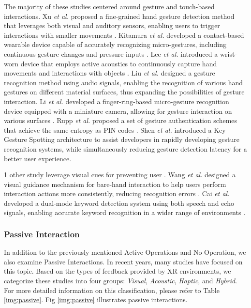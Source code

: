 \documentclass[review]{fcs}
\begin{document}
The majority of these studies centered around gesture and touch-based interactions. Xu \textit{et al.} proposed a fine-grained hand gesture detection method that leverages both visual and auditory sensors, enabling users to trigger interactions with smaller movements \cite{DBLP:conf/chi/XuZKN23}. Kitamura \textit{et al.} developed a contact-based wearable device capable of accurately recognizing micro-gestures, including continuous gesture changes and pressure inputs \cite{DBLP:conf/iswc/KitamuraYS23}. Lee \textit{et al.} introduced a wrist-worn device that employs active acoustics to continuously capture hand movements and interactions with objects \cite{DBLP:conf/chi/LeeZAYGLKYDLSGZ24}. Liu \textit{et al.} designed a gesture recognition method using audio signals, enabling the recognition of various hand gestures on different material surfaces, thus expanding the possibilities of gesture interaction\cite{10522613}. Li \textit{et al.} developed a finger-ring-based micro-gesture recognition device equipped with a miniature camera, allowing for gesture interaction on various surfaces \cite{DBLP:conf/ismar/LiLMHLS22}. Rupp \textit{et al.} proposed a set of gesture authentication schemes that achieve the same entropy as PIN codes \cite{DBLP:conf/vr/RuppGBK24}. Shen \textit{et al.} introduced a Key Gesture Spotting architecture to assist developers in rapidly developing gesture recognition systems, while simultaneously reducing gesture detection latency for a better user experience.

1 other study leverage visual cues for preventing user
 \cite{DBLP:journals/tvcg/ShenDMK22}. Wang \textit{et al.} designed a visual guidance mechanism for bare-hand interaction to help users perform interaction actions more consistently, reducing recognition errors \cite{DBLP:conf/chi/WangLZ24}. Cai \textit{et al.} developed a dual-mode keyword detection system using both speech and echo signals, enabling accurate keyword recognition in a wider range of environments 
 \cite{DBLP:journals/tvcg/CaiML24}.


\subsubsection{Passive Interaction}
In addition to the previously mentioned {Active Operations} and {No Operation}, we also examine {Passive Interactions}. In recent years, many studies have focused on this topic. Based on the types of feedback provided by XR environments, we categorize these studies into four groups: \textit{Visual}, \textit{Acoustic}, \textit{Haptic}, and \textit{Hybrid}. For more detailed information on this classification, please refer to Table \ref{img:passive}. Fig \ref{img:passive} illustrates passive interactions.
\end{document}
